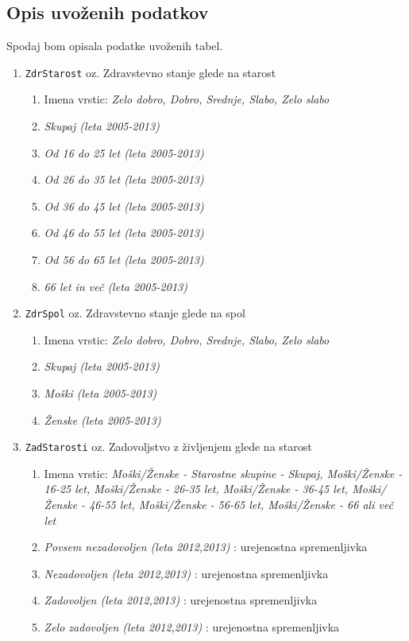 \documentclass[11pt,a4paper]{article}
\begin{document}
\subsection{Opis uvoženih podatkov}
Spodaj bom opisala podatke uvoženih tabel.
\begin{enumerate}
\item \verb+ZdrStarost+ oz. Zdravstevno stanje glede na starost
\begin{enumerate}
\item Imena vrstic: \textit{Zelo dobro, Dobro, Srednje, Slabo, Zelo slabo}
\item \textit{Skupaj (leta 2005-2013)}
\item \textit{Od 16 do 25 let (leta 2005-2013)} 
\item \textit{Od 26 do 35 let (leta 2005-2013)} 
\item \textit{Od 36 do 45 let (leta 2005-2013)}
\item \textit{Od 46 do 55 let (leta 2005-2013)} 
\item \textit{Od 56 do 65 let (leta 2005-2013)} 
\item \textit{66 let in več (leta 2005-2013)} 
\end{enumerate}
\item \verb+ZdrSpol+ oz. Zdravstevno stanje glede na spol
\begin{enumerate}
\item Imena vrstic: \textit{Zelo dobro, Dobro, Srednje, Slabo, Zelo slabo}
\item \textit{Skupaj (leta 2005-2013)} 
\item \textit{Moški (leta 2005-2013)} 
\item \textit{Ženske (leta 2005-2013)} 
\end{enumerate}
\item \verb+ZadStarosti+ oz. Zadovoljstvo z življenjem glede na starost
\begin{enumerate}
\item Imena vrstic: \textit{Moški/Ženske - Starostne skupine - Skupaj, Moški/Ženske - 16-25 let, Moški/Ženske - 26-35 let, Moški/Žen\-ske - 36-45 let, Moški/Ženske - 46-55 let, Moški/Ženske - 56-65 let, Moški/Ženske - 66 ali več let}
\item \textit{Povsem nezadovoljen (leta 2012,2013)} : urejenostna spremenljivka
\item \textit{Nezadovoljen (leta 2012,2013)} : urejenostna spremenljivka
\item \textit{Zadovoljen (leta 2012,2013)} : urejenostna spremenljivka
\item \textit{Zelo zadovoljen (leta 2012,2013)} : urejenostna spremenljivka

\end{enumerate}
\end{enumerate}
\end{document}
